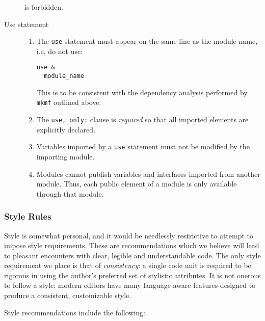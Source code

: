 \begin{description}
  is forbidden.
  
\item[Use statement]
\begin{enumerate}

\item The \texttt{use} statement must appear on the same line as
  the module name, i.e, do not use:

\begin{verbatim}
use &
  module_name
\end{verbatim}

  This is to be consistent with the dependency analysis performed by
  \texttt{mkmf} outlined above.
\item The \texttt{use, only:} clause is \emph{required} so that all
  imported elements are explicitly declared.
\item Variables imported by a \texttt{use} statement must not be
  modified by the importing module.
\item Modules cannot publish variables and interfaces imported from
  another module. Thus, each public element of a module is only
  available through that module. 
\end{enumerate}

\end{description}

\subsubsection{Style Rules}

Style is somewhat personal, and it would be needlessly restrictive to
attempt to impose style requirements. These are recommendations which
we believe will lead to pleasant encounters with clear, legible and
understandable code. The only style requirement we place is that of
{\it consistency}: a single code unit is required to be rigorous in
using the author's preferred set of stylistic attributes.  It is not
onerous to follow a style: modern editors have many language-aware
features designed to produce a consistent, customizable style.

Style recommendations include the following:

